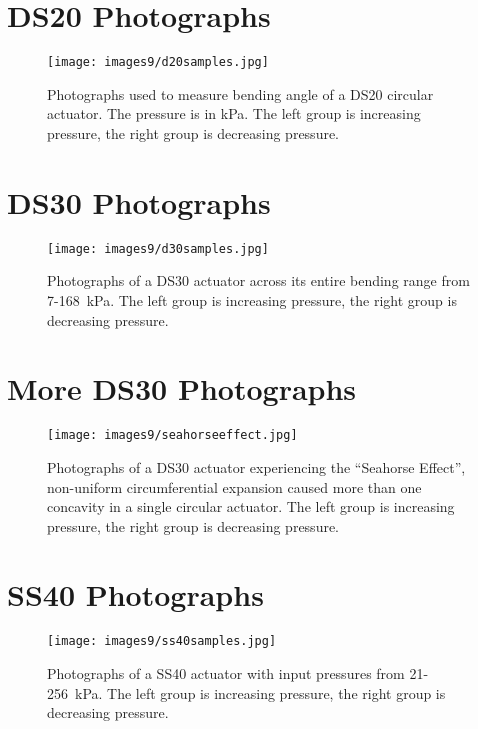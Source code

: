 \chapter{DS20 Photographs}
\label{appendix:d20all}

\begin{figure}[ht]
    \centering
     \texttt{[image: images9/d20samples.jpg]}
    \caption{Photographs used to measure bending angle of a DS20 circular actuator. The pressure is in kPa. The left group is increasing pressure, the right group is decreasing pressure.}
    \label{fig:d20samples}
\end{figure}

\chapter{DS30 Photographs}
\label{appendix:d30all}

\begin{figure}[ht]
    \centering
     \texttt{[image: images9/d30samples.jpg]}
    \caption{Photographs of a DS30 actuator across its entire bending range from 7-168~kPa. The left group is increasing pressure, the right group is decreasing pressure.}
    \label{fig:d30samples}
\end{figure}

\chapter{More DS30 Photographs}
\label{appendix:d30seahorse}

\begin{figure}[ht]
    \centering
     \texttt{[image: images9/seahorseeffect.jpg]}
    \caption{Photographs of a DS30 actuator experiencing the ``Seahorse Effect'', non-uniform circumferential expansion caused more than one concavity in a single circular actuator. The left group is increasing pressure, the right group is decreasing pressure.}
    \label{fig:seahorseeffect}
\end{figure}

\chapter{SS40 Photographs}
\label{appendix:s40all}

\begin{figure}[ht]
    \centering
     \texttt{[image: images9/ss40samples.jpg]}
    \caption{Photographs of a SS40 actuator with input pressures from 21-256~kPa. The left group is increasing pressure, the right group is decreasing pressure.}
    \label{fig:ss40samples}
\end{figure}

